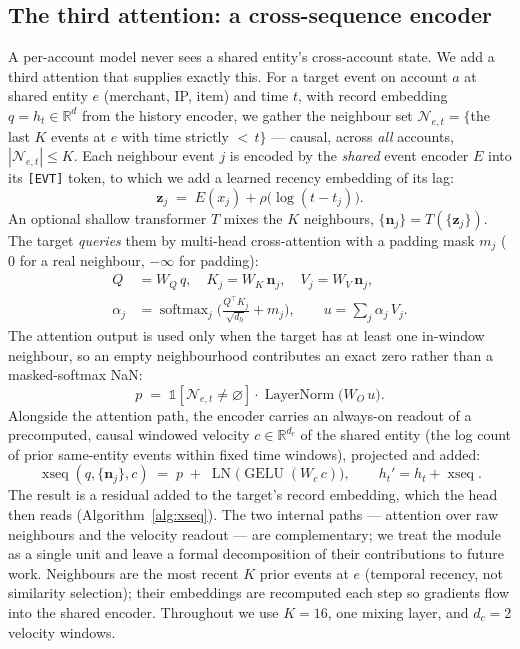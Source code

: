 

\subsection{The third attention: a cross-sequence encoder}
\label{sec:method:xseq}
A per-account model never sees a shared entity's cross-account state. We add a third attention that
supplies exactly this. For a target event on account $a$ at shared entity $e$ (merchant, IP, item)
and time $t$, with record embedding $q{=}h_t\in\mathbb{R}^d$ from the history encoder, we gather the
neighbour set $\mathcal{N}_{e,t}=\{$the last $K$ events at $e$ with time strictly ${<}\,t\}$ ---
causal, across \emph{all} accounts, $|\mathcal{N}_{e,t}|\le K$. Each neighbour event $j$ is encoded
by the \emph{shared} event encoder $E$ into its \texttt{[EVT]} token, to which we add a learned
recency embedding of its lag:
\begin{equation}
\mathbf{z}_j \;=\; E(x_j) + \rho\!\big(\log(t-t_j)\big).
\end{equation}
An optional shallow transformer $T$ mixes the $K$ neighbours, $\{\mathbf{n}_j\}=T(\{\mathbf{z}_j\})$.
The target \emph{queries} them by multi-head cross-attention with a padding mask $m_j$ ($0$ for a
real neighbour, $-\infty$ for padding):
\begin{align}
Q &= W_Q\,q,\quad K_j = W_K\,\mathbf{n}_j,\quad V_j = W_V\,\mathbf{n}_j,\\
\alpha_j &= \operatorname{softmax}_j\!\Big(\tfrac{Q^{\top}K_j}{\sqrt{d_h}} + m_j\Big),\qquad
u = \textstyle\sum_j \alpha_j\,V_j .
\end{align}
The attention output is used only when the target has at least one in-window neighbour, so an
empty neighbourhood contributes an exact zero rather than a masked-softmax NaN:
\begin{equation}
p \;=\; \mathbb{1}\!\left[\mathcal{N}_{e,t}\neq\varnothing\right]\cdot
\operatorname{LayerNorm}\!\big(W_O\,u\big).
\end{equation}
Alongside the attention path, the encoder carries an always-on readout of a precomputed,
causal windowed velocity $c\in\mathbb{R}^{d_c}$ of the shared entity (the log count of prior
same-entity events within fixed time windows), projected and added:
\begin{equation}
\operatorname{xseq}(q,\{\mathbf{n}_j\},c) \;=\; p \;+\; \operatorname{LN}\!\big(\operatorname{GELU}(W_c\,c)\big),
\qquad h_t' = h_t + \operatorname{xseq} .
\end{equation}
The result is a residual added to the target's record embedding, which the head then reads
(Algorithm~\ref{alg:xseq}). The two internal paths --- attention over raw neighbours and the velocity
readout --- are complementary; we treat the module as a single unit and leave a formal decomposition
of their contributions to future work. Neighbours are the most recent $K$ prior events at $e$
(temporal recency, not similarity selection); their embeddings are recomputed each step so gradients
flow into the shared encoder. Throughout we use $K{=}\num{16}$, one mixing layer, and $d_c{=}\num{2}$
velocity windows.

